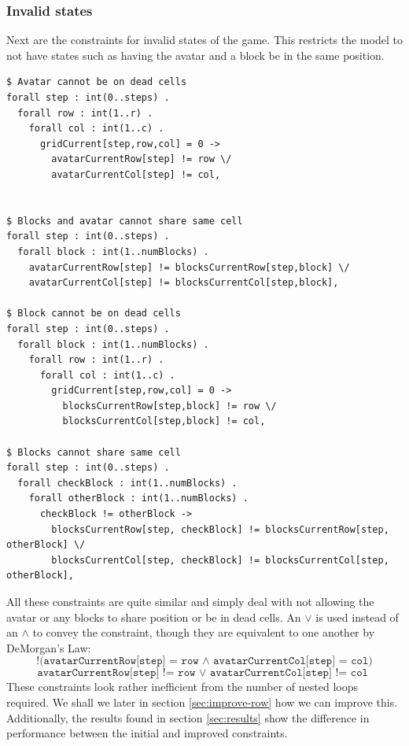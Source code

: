 \documentclass{article}
\begin{document}
\subsubsection{Invalid states}
Next are the constraints for invalid states of the game. This restricts the model to not have states such as having the avatar and a block be in the same position. 

\begin{lstlisting}[caption={Constraints to prevent invalid game states}, captionpos=b]
$ Avatar cannot be on dead cells
forall step : int(0..steps) .
  forall row : int(1..r) .
    forall col : int(1..c) .
	  gridCurrent[step,row,col] = 0 -> 
	    avatarCurrentRow[step] != row \/ 
	    avatarCurrentCol[step] != col,


$ Blocks and avatar cannot share same cell
forall step : int(0..steps) .
  forall block : int(1..numBlocks) .
    avatarCurrentRow[step] != blocksCurrentRow[step,block] \/
	avatarCurrentCol[step] != blocksCurrentCol[step,block],

$ Block cannot be on dead cells
forall step : int(0..steps) .
  forall block : int(1..numBlocks) .
    forall row : int(1..r) .
	  forall col : int(1..c) .
	    gridCurrent[step,row,col] = 0 -> 
	      blocksCurrentRow[step,block] != row \/
		  blocksCurrentCol[step,block] != col,

$ Blocks cannot share same cell				       
forall step : int(0..steps) .
  forall checkBlock : int(1..numBlocks) .
    forall otherBlock : int(1..numBlocks) .
	  checkBlock != otherBlock ->
	    blocksCurrentRow[step, checkBlock] != blocksCurrentRow[step, otherBlock] \/
		blocksCurrentCol[step, checkBlock] != blocksCurrentCol[step, otherBlock],
\end{lstlisting}
All these constraints are quite similar and simply deal with not allowing the avatar or any blocks to share position or be in dead cells. An $\vee$ is used instead of an $\wedge$ to convey the constraint, though they are equivalent to one another by DeMorgan's Law:
\begin{equation}
\texttt{!(avatarCurrentRow[step] = row $\wedge$ avatarCurrentCol[step] = col)}
\end{equation}
\begin{equation}
\texttt{avatarCurrentRow[step] != row $\vee$ avatarCurrentCol[step] != col\ }
\end{equation}
\noindent
These constraints look rather inefficient from the number of nested loops required. We shall we later in section \ref{sec:improve-row} how we can improve this. Additionally, the results found in section \ref{sec:results} show the difference in performance between the initial and improved constraints.
\end{document}

